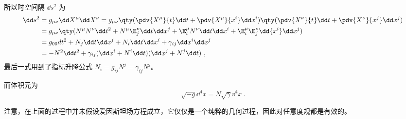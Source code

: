 所以时空间隔 $\dd s^2$ 为
\begin{equation}
\begin{aligned}
\dd s^2&=g_{\mu\nu}\dd X^\mu\dd X^\nu=g_{\mu\nu}\qty(\pdv{X^\mu}{t}\dd t+\pdv{X^\mu}{x^i}\dd x^i)\qty(\pdv{X^\nu}{t}\dd t+\pdv{X^\nu}{x^j}\dd x^j)\\
&=g_{\mu\nu}\qty(N^\mu N^\nu\dd t^2+N^\mu \E^\nu_j\dd t\dd x^j+\E^\mu_iN^\nu\dd t\dd x^i+\E^{\mu}_i \E^{\nu}_j\dd {x^i}\dd x^j)\\
&=g_{00}dt^2+N_j\dd t\dd x^j+N_i\dd t\dd x^i+\gamma_{ij}\dd x^i\dd x^j\\
&=-N^2\dd t^2+\gamma_{ij}(\dd x^i+N^i\dd t)(\dd x^j+N^j\dd t)~,
\end{aligned}
\end{equation}
最后一式用到了指标升降公式 $N_i=g_{ij}N^j=\gamma_{ij}N^j$。

而体积元为
\begin{equation}\label{eq_ADMF_4}
\sqrt{-g}{\dd}^4 x=N\sqrt{\gamma}{\dd}^4x~.
\end{equation}

注意，在上面的过程中并未假设爱因斯坦场方程成立，它仅仅是一个纯粹的几何过程，因此对任意度规都是有效的。
